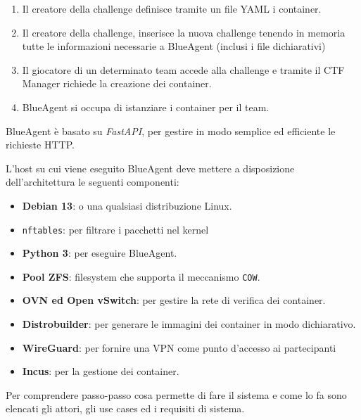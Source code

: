 \begin{enumerate}
\def\labelenumi{\arabic{enumi}.}
\tightlist
\item
  Il creatore della challenge definisce tramite un file YAML i
  container.
\item
  Il creatore della challenge, inserisce la nuova challenge tenendo in
  memoria tutte le informazioni necessarie a BlueAgent (inclusi i file
  dichiarativi)
\item
  Il giocatore di un determinato team accede alla challenge e tramite il
  CTF Manager richiede la creazione dei container.
\item
  BlueAgent si occupa di istanziare i container per il team.
\end{enumerate}

BlueAgent è basato su \emph{FastAPI}, per gestire in modo semplice ed
efficiente le richieste HTTP.

L'host su cui viene eseguito BlueAgent deve mettere a disposizione
dell'architettura le seguenti componenti:

\begin{itemize}
\tightlist
\item
  \textbf{Debian 13}: o una qualsiasi distribuzione Linux.
\item
  \passthrough{\lstinline!nftables!}: per filtrare i pacchetti nel
  kernel
\item
  \textbf{Python 3}: per eseguire BlueAgent.
\item
  \textbf{Pool ZFS}: filesystem che supporta il meccanismo
  \passthrough{\lstinline!COW!}.
\item
  \textbf{OVN ed Open vSwitch}: per gestire la rete di verifica dei
  container.
\item
  \textbf{Distrobuilder}: per generare le immagini dei container in modo
  dichiarativo.
\item
  \textbf{WireGuard}: per fornire una VPN come punto d'accesso ai
  partecipanti
\item
  \textbf{Incus}: per la gestione dei container.
\end{itemize}

Per comprendere passo-passo cosa permette di fare il sistema e come lo
fa sono elencati gli attori, gli use cases ed i requisiti di sistema.

